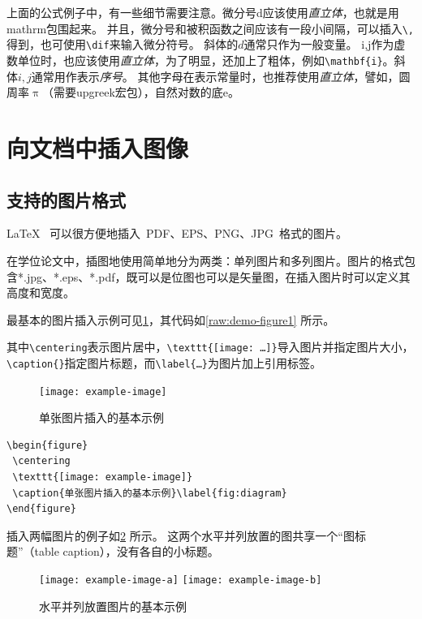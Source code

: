 上面的公式例子中，有一些细节需要注意。微分号d应该使用\emph{直立体}，也就是用mathrm包围起来。
并且，微分号和被积函数之间应该有一段小间隔，可以插入\verb+\,+得到，也可使用\verb+\dif+来输入微分符号。
斜体的$d$通常只作为一般变量。
i,j作为虚数单位时，也应该使用\emph{直立体}，为了明显，还加上了粗体，例如\verb+\mathbf{i}+。斜体$i,j$通常用作表示\emph{序号}。
其他字母在表示常量时，也推荐使用\emph{直立体}，譬如，圆周率$\uppi$（需要upgreek宏包），自然对数的底$\mathrm{e}$。


\section{向文档中插入图像}
\label{sec:insertimage}

\subsection{支持的图片格式}
\label{sec:imageformat}

\LaTeX~ 可以很方便地插入~PDF、EPS、PNG、JPG~格式的图片。

在学位论文中，插图地使用简单地分为两类：单列图片和多列图片。图片的格式包含*.jpg、*.eps、*.pdf，既可以是位图也可以是矢量图，在插入图片时可以定义其高度和宽度。

最基本的图片插入示例可见\cref{fig:diagram}，其代码如\cref{raw:demo-figure1} 所示。

其中\verb+\centering+表示图片居中，\verb+\texttt{[image: …]}+导入图片并指定图片大小，\verb+\caption{}+指定图片标题，而\verb+\label{…}+为图片加上引用标签。

\begin{figure}
 \centering
 \texttt{[image: example-image]}
 \caption{单张图片插入的基本示例}\label{fig:diagram}
\end{figure}

\begin{lstlisting}[language={[LaTeX]TeX}, caption={示例插图代码}, label=raw:demo-figure1]
\begin{figure}
 \centering
 \texttt{[image: example-image]}
 \caption{单张图片插入的基本示例}\label{fig:diagram}
\end{figure}
\end{lstlisting}

插入两幅图片的例子如\cref{fig:png-jpg} 所示。
这两个水平并列放置的图共享一个“图标题”（table caption），没有各自的小标题。

\begin{figure}
  \centering
  \texttt{[image: example-image-a]}
  \hspace{1cm}
  \texttt{[image: example-image-b]}
  \caption{水平并列放置图片的基本示例}
  \label{fig:png-jpg}
\end{figure}

